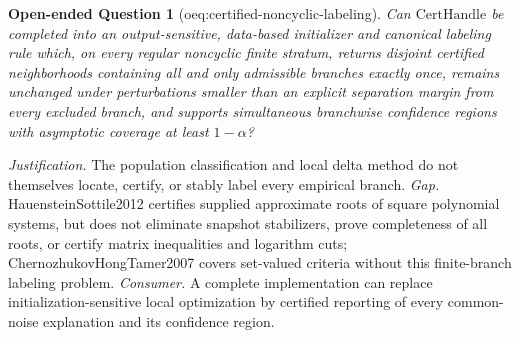 \documentclass{article}
\newtheorem{openendedquestion}{Open-ended Question}
\begin{document}
\begin{openendedquestion}[oeq:certified-noncyclic-labeling]\label{oeq:certified-noncyclic-labeling}
Can \(\text{CertHandle}\) be completed into an output-sensitive, data-based initializer and canonical labeling rule which, on every regular noncyclic finite stratum, returns disjoint certified neighborhoods containing all and only admissible branches exactly once, remains unchanged under perturbations smaller than an explicit separation margin from every excluded branch, and supports simultaneous branchwise confidence regions with asymptotic coverage at least \(1-\alpha\)?
\end{openendedquestion}
\par\smallskip\noindent \textit{Justification.} The population classification and local delta method do not themselves locate, certify, or stably label every empirical branch. \textit{Gap.} HauensteinSottile2012 certifies supplied approximate roots of square polynomial systems, but does not eliminate snapshot stabilizers, prove completeness of all roots, or certify matrix inequalities and logarithm cuts; ChernozhukovHongTamer2007 covers set-valued criteria without this finite-branch labeling problem. \textit{Consumer.} A complete implementation can replace initialization-sensitive local optimization by certified reporting of every common-noise explanation and its confidence region.
\end{document}
